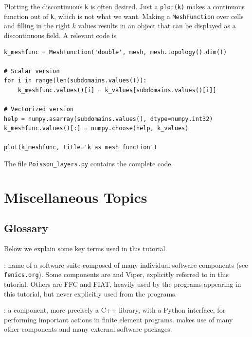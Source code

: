 Plotting the discontinuous {\fontsize{12pt}{12pt}\texttt{k}} is often desired. Just a {\fontsize{12pt}{12pt}\texttt{plot(k)}}
makes a continuous function out of {\fontsize{12pt}{12pt}\texttt{k}}, which is not what we want.
Making a {\fontsize{12pt}{12pt}\texttt{MeshFunction}} over cells and filling in the right $k$
values results in an object that can be displayed as a discontinuous field.
A relevant code is
\begin{Verbatim}[fontsize=\fontsize{10pt}{10pt},tabsize=8,baselinestretch=1.05,
fontfamily=tt,xleftmargin=7mm]
k_meshfunc = MeshFunction('double', mesh, mesh.topology().dim())

# Scalar version
for i in range(len(subdomains.values())):
    k_meshfunc.values()[i] = k_values[subdomains.values()[i]]

# Vectorized version
help = numpy.asarray(subdomains.values(), dtype=numpy.int32)
k_meshfunc.values()[:] = numpy.choose(help, k_values)

plot(k_meshfunc, title='k as mesh function')
\end{Verbatim}
\noindent
The file {\fontsize{12pt}{12pt}\verb!Poisson_layers.py!} contains the complete code.


\section{Miscellaneous Topics}

\subsection{Glossary}

\newcommand{\gln}{\vspace{2mm}\par}

Below we explain some key terms used in this tutorial.

\fenics: name of a software suite composed of many individual software
components (see {\fontsize{12pt}{12pt}\texttt{fenics.org}}). Some components are \dolfin{} and
Viper, explicitly referred to in this tutorial. Others are
FFC and FIAT, heavily used by the programs appearing in this tutorial,
but never explicitly used from the programs.\gln

\dolfin: a \fenics{} component, more precisely a C++ library, with
a Python interface, for performing important actions in finite element
programs. \dolfin{} makes use of many other \fenics{} components and
many external software packages.\gln


